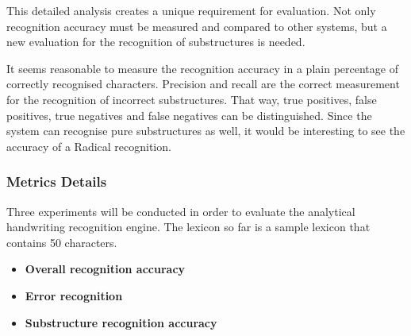 This detailed analysis creates a unique requirement for evaluation. Not only
recognition accuracy must be measured and compared to other systems,
but a new evaluation for the recognition of substructures is needed.

It seems reasonable to measure the recognition accuracy in a plain 
percentage of correctly recognised characters. 
Precision and recall are the correct measurement for the recognition of 
incorrect substructures. That way, true positives, false positives, 
true negatives and false negatives can be distinguished.
Since the system can recognise pure substructures as well, it would 
be interesting to see the accuracy of a Radical recognition.

\subsubsection{Metrics Details}
\label{sec:eval:metricsdetails}

Three experiments will be conducted in order to evaluate the analytical
handwriting recognition engine. The lexicon so far is a sample lexicon that 
contains 50 characters.

\begin{itemize}
  \item \textbf{Overall recognition accuracy}
  \item \textbf{Error recognition}
  \item \textbf{Substructure recognition accuracy}
\end{itemize}


